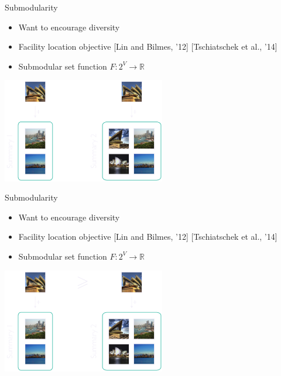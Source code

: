 \documentclass[mathserif]{beamer}
\newcommand{\qcite}[1]{{\scriptsize\color{col2}[#1]}}
\begin{document}
\begin{frame}{Submodularity}
\vspace{0.5em}
\begin{itemize}
\item Want to encourage diversity
\vspace{1em}
\item Facility location objective \qcite{Lin and Bilmes, '12} \qcite{Tschiatschek et al., '14}
\vspace{1em}
\item Submodular set function $F : 2^V \to \mathbb{R}$
\end{itemize}

\vspace{1em}
\centering
\includegraphics[width=2.8in]{figures/submod_2.pdf}
\end{frame}

\begin{frame}{Submodularity}
\vspace{0.5em}
\begin{itemize}
\item Want to encourage diversity
\vspace{1em}
\item Facility location objective \qcite{Lin and Bilmes, '12} \qcite{Tschiatschek et al., '14}
\vspace{1em}
\item Submodular set function $F : 2^V \to \mathbb{R}$
\end{itemize}

\vspace{1em}
\centering
\includegraphics[width=2.8in]{figures/submod_3.pdf}
\end{frame}
\end{document}
